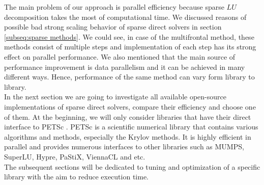 The main problem of our approach is parallel efficiency because sparse $LU$ decomposition takes the most of computational time. We discussed reasons of possible bad strong scaling behavior of sparse direct solvers in section \ref{subseq:sparse methods}. We could see, in case of the multifrontal method, these methods consist of multiple steps and implementation of each step has its strong effect on parallel performance. We also mentioned that the main source of performance improvement is data parallelism and it can be achieved in many different ways. Hence, performance of the same method can vary form library to library.\\


In the next section we are going to investigate all available open-source implementations of sparse direct solvers, compare their efficiency and choose one of them. At the beginning, we will only consider libraries that have their direct interface to PETSc \cite{petsc-web-page}. PETSc is a scientific numerical library that contains various algorithms and methods, especially the Krylov methods. It is highly efficient in parallel and provides numerous interfaces to other libraries such as MUMPS, SuperLU, Hypre, PaStiX, ViennaCL and etc.\\ 


The subsequent sections will be dedicated to tuning and optimization of a specific library with the aim to reduce execution time. \\